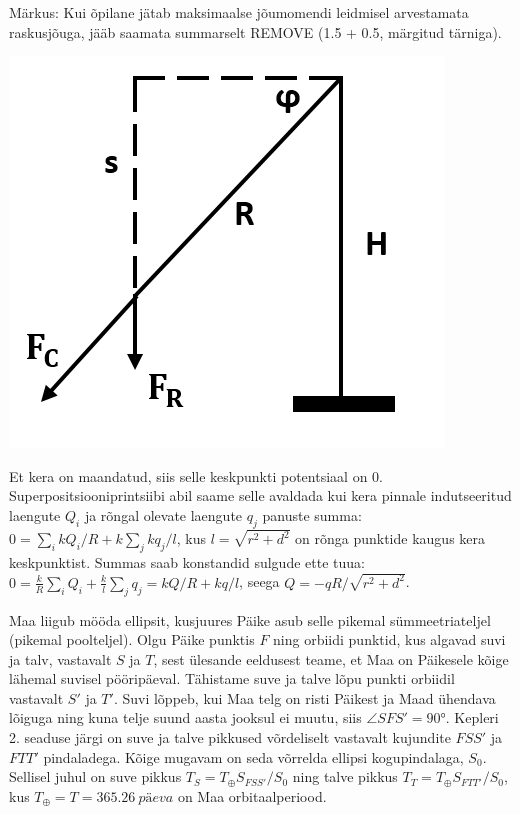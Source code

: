 \documentclass[10pt]{article}
\newcommand{\pp}[1]{REMOVE}
\begin{document}
Märkus: Kui õpilane jätab maksimaalse jõumomendi leidmisel arvestamata raskusjõuga, jääb saamata summarselt \pp{2} (1.5 + 0.5, märgitud tärniga).
\begin{center}
\includegraphics[scale=0.5]{2019-v2g-09-yl.png}
\end{center}
\probend
\bigskip

\setAuthor{}

\solu
Et kera on maandatud, siis selle keskpunkti potentsiaal on 0. Superpositsiooniprintsiibi abil saame selle avaldada kui kera pinnale indutseeritud laengute $Q_i$ ja rõngal olevate laengute $q_j$ panuste summa: $0=\sum_i kQ_i/R+k\sum_jkq_j/l$, kus $l=\sqrt{r^2+d^2}$ on rõnga punktide kaugus kera keskpunktist. Summas saab konstandid sulgude ette tuua: $0=\frac kR \sum_iQ_i+\frac kl\sum_jq_j=kQ/R+kq/l$, seega $Q=-qR/\sqrt{r^2+d^2}$.
\probend
\bigskip


\solu
Maa liigub mööda ellipsit, kusjuures Päike asub selle pikemal sümmeetriateljel (pikemal poolteljel). Olgu Päike punktis $F$ ning orbiidi punktid, kus algavad suvi ja talv, vastavalt $S$ ja $T$, sest ülesande eeldusest teame, et Maa on Päikesele kõige lähemal suvisel pööripäeval. Tähistame suve ja talve lõpu punkti orbiidil vastavalt $S'$ ja $T'$. Suvi lõppeb, kui Maa telg on risti Päikest ja Maad ühendava lõiguga ning kuna telje suund aasta jooksul ei muutu, siis $\angle SFS' = \ang{90}$. Kepleri 2. seaduse järgi on suve ja talve pikkused võrdeliselt vastavalt kujundite $FSS'$ ja $FTT'$ pindaladega. Kõige mugavam on seda võrrelda ellipsi kogupindalaga, $S_0$. Sellisel juhul on suve pikkus $T_S = T_\oplus S_{FSS'}/S_0 $ ning talve pikkus $T_T = T_\oplus S_{FTT'}/S_0$, kus $T_\oplus = T =\SI{365.26}{päeva}$ on Maa orbitaalperiood.	
\end{document}
